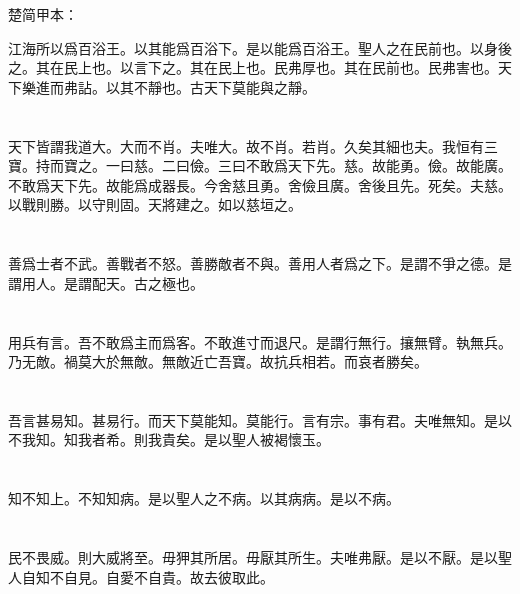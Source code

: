 \documentclass[a5paper]{ctexbook}
\begin{document}
    楚简甲本：

    江海所以爲百浴王。以其能爲百浴下。是以能爲百浴王。聖人之在民前也。以身後之。其在民上也。以言下之。其在民上也。民弗厚也。其在民前也。民弗害也。天下樂進而弗詀。以其不靜也。古天下莫能與之靜。

    \chapter{}

    天下皆謂我道大。大而不肖。夫唯大。故不肖。若肖。久矣其細也夫。我恒有三寶。持而寶之。一曰慈。二曰儉。三曰不敢爲天下先。慈。故能勇。儉。故能廣。不敢爲天下先。故能爲成器長。今舍慈且勇。舍儉且廣。舍後且先。死矣。夫慈。以戰則勝。以守則固。天將建之。如以慈垣之。

    \chapter{}

    善爲士者不武。善戰者不怒。善勝敵者不與。善用人者爲之下。是謂不爭之德。是謂用人。是謂配天。古之極也。

    \chapter{}

    用兵有言。吾不敢爲主而爲客。不敢進寸而退尺。是謂行無行。攘無臂。執無兵。乃无敵。禍莫大於無敵。無敵近亡吾寶。故抗兵相若。而哀者勝矣。

    \chapter{}

    吾言甚易知。甚易行。而天下莫能知。莫能行。言有宗。事有君。夫唯無知。是以不我知。知我者希。則我貴矣。是以聖人被褐懷玉。

    \chapter{}

    知不知上。不知知病。是以聖人之不病。以其病病。是以不病。

    \chapter{}

    民不畏威。則大威將至。毋狎其所居。毋厭其所生。夫唯弗厭。是以不厭。是以聖人自知不自見。自愛不自貴。故去彼取此。
\end{document}
